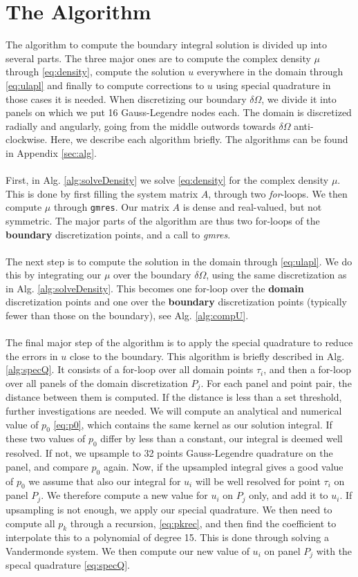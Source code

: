 \documentclass[a4paper,10pt]{article}
\def\code#1{\texttt{#1}}
\begin{document}
\section*{The Algorithm}
The algorithm to compute the boundary integral solution is divided up into several parts. The three major ones are to compute the complex density $\mu$ through \eqref{eq:density}, compute the solution $u$ everywhere in the domain through \eqref{eq:ulapl} and finally to compute corrections to $u$ using special quadrature in those cases it is needed. When discretizing our boundary $\delta\Omega$, we divide it into panels on which we put 16 Gauss-Legendre nodes each. The domain is discretized radially and angularly, going from the middle outwords towards $\delta\Omega$ anti-clockwise. Here, we describe each algorithm briefly. The algorithms can be found in Appendix \ref{sec:alg}. 
\\ \\
First, in Alg. \ref{alg:solveDensity} we solve \eqref{eq:density} for the complex density $\mu$. This is done by first filling the system matrix $A$, through two \textit{for}-loops. We then compute $\mu$ through \code{gmres}. Our matrix $A$ is dense and real-valued, but not symmetric. The major parts of the algorithm are thus two for-loops of the \textbf{boundary} discretization points, and a call to \textit{gmres}.
\\ \\
The next step is to compute the solution in the domain through \eqref{eq:ulapl}. We do this by integrating our $\mu$ over the boundary $\delta\Omega$, using the same discretization as in Alg. \ref{alg:solveDensity}. This becomes one for-loop over the \textbf{domain} discretization points and one over the \textbf{boundary} discretization points (typically fewer than those on the boundary), see Alg. \ref{alg:compU}.
\\ \\
The final major step of the algorithm is to apply the special quadrature \cite{ojalahelsing} to reduce the errors in $u$ close to the boundary. This algorithm is briefly described in Alg. \ref{alg:specQ}. It consists of a for-loop over all domain points $\tau_i$, and then a for-loop over all panels of the domain discretization $P_j$. For each panel and point pair, the distance between them is computed. If the distance is less than a set threshold, further investigations are needed. We will compute an analytical and numerical value of $p_0$ \eqref{eq:p0}, which contains the same kernel as our solution integral. If these two values of $p_0$ differ by less than a constant, our integral is deemed well resolved. If not, we upsample to 32 points Gauss-Legendre quadrature on the panel, and compare $p_0$ again. Now, if the upsampled integral gives a good value of $p_0$ we assume that also our integral for $u_i$ will be well resolved for point $\tau_i$ on panel $P_j$. We therefore compute a new value for $u_i$ on $P_j$ only, and add it to $u_i$. If upsampling is not enough, we apply our special quadrature. We then need to compute all $p_k$ through a recursion, \eqref{eq:pkrec}, and then find the coefficient to interpolate this to a polynomial of degree 15. This is done through solving a Vandermonde system. We then compute our new value of $u_i$ on panel $P_j$ with the specal quadrature \eqref{eq:specQ}. 
\end{document}
